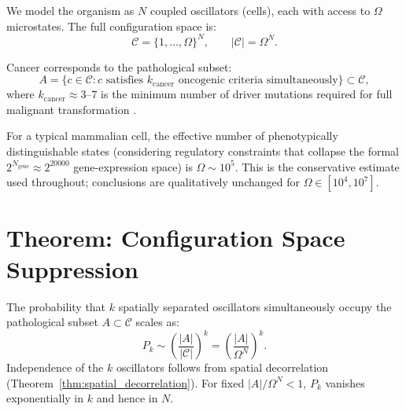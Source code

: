 We model the organism as $N$ coupled oscillators (cells), each with access to
$\Omega$ microstates. The full configuration space is:
\begin{equation}
  \mathcal{C} = \{1, \ldots, \Omega\}^N, \qquad |\mathcal{C}| = \Omega^N.
  \label{eq:config_space}
\end{equation}

Cancer corresponds to the pathological subset:
\begin{equation}
  A = \{c \in \mathcal{C} : c \text{ satisfies } k_{\mathrm{cancer}}
  \text{ oncogenic criteria simultaneously}\} \subset \mathcal{C},
  \label{eq:pathological_set}
\end{equation}
where $k_{\mathrm{cancer}} \approx 3$--$7$ is the minimum number of driver
mutations required for full malignant transformation \citep{vogelstein2013}.

\begin{remark}
For a typical mammalian cell, the effective number of phenotypically distinguishable
states (considering regulatory constraints that collapse the formal $2^{N_{\mathrm{gene}}}
\approx 2^{20000}$ gene-expression space) is $\Omega \sim 10^5$. This is the
conservative estimate used throughout; conclusions are qualitatively unchanged
for $\Omega \in [10^4, 10^7]$.
\end{remark}

\section{Theorem: Configuration Space Suppression}
\label{sec:config_space_suppression}

\begin{theorem}
\label{thm:config_space_suppression}
The probability that $k$ spatially separated oscillators simultaneously occupy
the pathological subset $A \subset \mathcal{C}$ scales as:
\begin{equation}
  P_k \sim \left(\frac{|A|}{|\mathcal{C}|}\right)^k = \left(\frac{|A|}{\Omega^N}\right)^k.
  \label{eq:css}
\end{equation}
Independence of the $k$ oscillators follows from spatial decorrelation
(Theorem~\ref{thm:spatial_decorrelation}). For fixed $|A|/\Omega^N < 1$,
$P_k$ vanishes exponentially in $k$ and hence in $N$.
\end{theorem}

